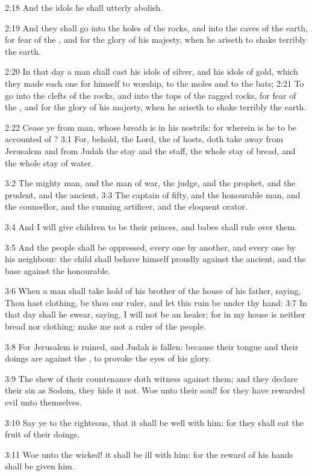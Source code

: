 2:18 And the idols he shall utterly abolish.

2:19 And they shall go into the holes of the rocks, and into the caves of the earth, for fear of the \LORD, and for the glory of his majesty, when he ariseth to shake terribly the earth.

2:20 In that day a man shall cast his idols of silver, and his idols of gold, which they made each one for himself to worship, to the moles and to the bats; 2:21 To go into the clefts of the rocks, and into the tops of the ragged rocks, for fear of the \LORD, and for the glory of his majesty, when he ariseth to shake terribly the earth.

2:22 Cease ye from man, whose breath is in his nostrils: for wherein is he to be accounted of ?  3:1 For, behold, the Lord, the \LORD of hosts, doth take away from Jerusalem and from Judah the stay and the staff, the whole stay of bread, and the whole stay of water.

3:2 The mighty man, and the man of war, the judge, and the prophet, and the prudent, and the ancient, 3:3 The captain of fifty, and the honourable man, and the counsellor, and the cunning artificer, and the eloquent orator.

3:4 And I will give children to be their princes, and babes shall rule over them.

3:5 And the people shall be oppressed, every one by another, and every one by his neighbour: the child shall behave himself proudly against the ancient, and the base against the honourable.

3:6 When a man shall take hold of his brother of the house of his father, saying, Thou hast clothing, be thou our ruler, and let this ruin be under thy hand: 3:7 In that day shall he swear, saying, I will not be an healer; for in my house is neither bread nor clothing: make me not a ruler of the people.

3:8 For Jerusalem is ruined, and Judah is fallen: because their tongue and their doings are against the \LORD, to provoke the eyes of his glory.

3:9 The shew of their countenance doth witness against them; and they declare their sin as Sodom, they hide it not. Woe unto their soul! for they have rewarded evil unto themselves.

3:10 Say ye to the righteous, that it shall be well with him: for they shall eat the fruit of their doings.

3:11 Woe unto the wicked! it shall be ill with him: for the reward of his hands shall be given him.

